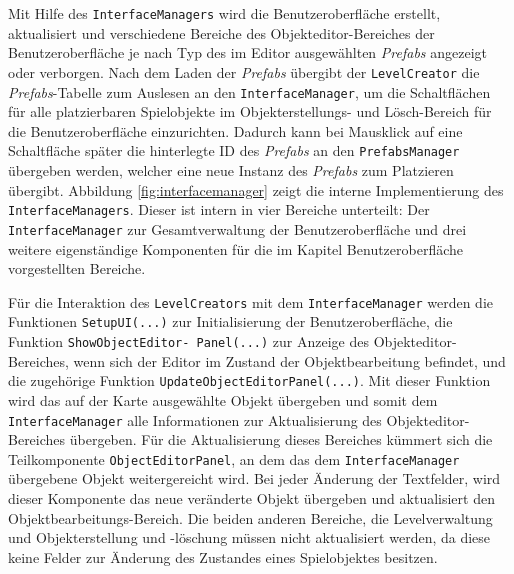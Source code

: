 Mit Hilfe des \texttt{InterfaceManagers} wird die Benutzeroberfläche erstellt, aktualisiert und verschiedene Bereiche des Objekteditor-Bereiches der Benutzeroberfläche je nach Typ des im Editor ausgewählten \textit{Prefabs} angezeigt oder verborgen. Nach dem Laden der \textit{Prefabs} übergibt der \texttt{LevelCreator} die \textit{Prefabs}-Tabelle zum Auslesen an den \texttt{InterfaceManager}, um die Schaltflächen für alle platzierbaren Spielobjekte im Objekterstellungs- und Lösch-Bereich für die Benutzeroberfläche einzurichten. Dadurch kann bei Mausklick auf eine Schaltfläche später die hinterlegte ID des \textit{Prefabs} an den \texttt{PrefabsManager} übergeben werden, welcher eine neue Instanz des \textit{Prefabs} zum Platzieren übergibt. Abbildung \ref{fig:interfacemanager} zeigt die interne Implementierung des \texttt{InterfaceManagers}. Dieser ist intern in vier Bereiche unterteilt: Der \texttt{InterfaceManager} zur Gesamtverwaltung der Benutzeroberfläche und drei weitere eigenständige Komponenten für die im Kapitel Benutzeroberfläche vorgestellten Bereiche. 

Für die Interaktion des \texttt{LevelCreators} mit dem \texttt{InterfaceManager} werden die Funktionen \texttt{SetupUI(...)} zur Initialisierung der Benutzeroberfläche, die Funktion \texttt{ShowObjectEditor- \linebreak Panel(...)} zur Anzeige des Objekteditor-Bereiches, wenn sich der Editor im Zustand der Objektbearbeitung befindet, und die zugehörige Funktion \texttt{UpdateObjectEditorPanel(...)}. Mit dieser Funktion wird das auf der Karte ausgewählte Objekt übergeben und somit dem \texttt{InterfaceManager} alle Informationen zur Aktualisierung des Objekteditor-Bereiches übergeben. Für die Aktualisierung dieses Bereiches kümmert sich die Teilkomponente \texttt{ObjectEditorPanel}, an dem das dem \texttt{InterfaceManager} übergebene Objekt weitergereicht wird. Bei jeder Änderung der Textfelder, wird dieser Komponente das neue veränderte Objekt übergeben und aktualisiert den Objektbearbeitungs-Bereich. Die beiden anderen Bereiche, die Levelverwaltung und Objekterstellung und -löschung müssen nicht aktualisiert werden, da diese keine Felder zur Änderung des Zustandes eines Spielobjektes besitzen.

